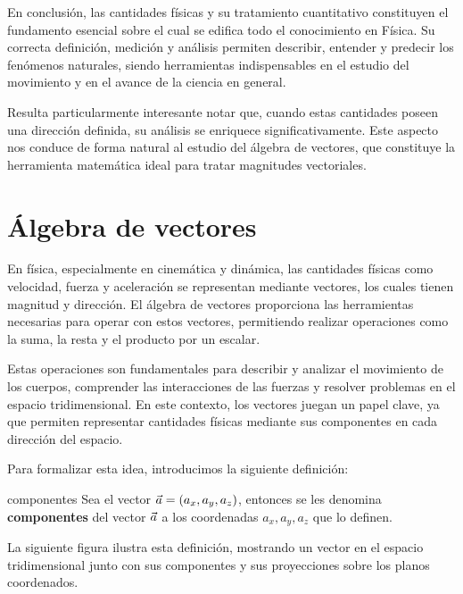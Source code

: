 En conclusión, las cantidades físicas y su tratamiento cuantitativo constituyen el fundamento esencial sobre el cual se edifica todo el conocimiento en Física. Su correcta definición, medición y análisis permiten describir, entender y predecir los fenómenos naturales, siendo herramientas indispensables en el estudio del movimiento y en el avance de la ciencia en general.

Resulta particularmente interesante notar que, cuando estas cantidades poseen una dirección definida, su análisis se enriquece significativamente. Este aspecto nos conduce de forma natural al estudio del álgebra de vectores, que constituye la herramienta matemática ideal para tratar magnitudes vectoriales.

\section{Álgebra de vectores}

En física, especialmente en cinemática y dinámica, las cantidades físicas como velocidad, fuerza y aceleración se representan mediante vectores, los cuales tienen magnitud y dirección. El álgebra de vectores proporciona las herramientas necesarias para operar con estos vectores, permitiendo realizar operaciones como la suma, la resta y el producto por un escalar.

Estas operaciones son fundamentales para describir y analizar el movimiento de los cuerpos, comprender las interacciones de las fuerzas y resolver problemas en el espacio tridimensional. En este contexto, los vectores juegan un papel clave, ya que permiten representar cantidades físicas mediante sus componentes en cada dirección del espacio.

Para formalizar esta idea, introducimos la siguiente definición:

\begin{definition}{}{componentes}
    Sea el vector $\vec{a} = (a_x, a_y, a_z)$, entonces se les denomina \textbf{componentes} del vector $\vec{a}$ a los coordenadas $a_x, a_y, a_z$ que lo definen.
\end{definition}

La siguiente figura ilustra esta definición, mostrando un vector en el espacio tridimensional junto con sus componentes y sus proyecciones sobre los planos coordenados.

